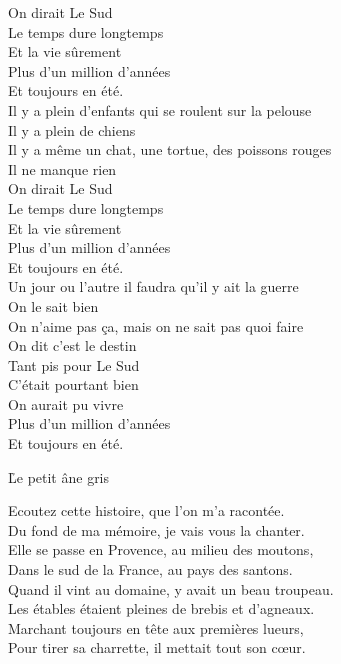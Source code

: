 \documentclass{novel}
\begin{document}
On dirait Le Sud \\
Le temps dure longtemps \\
Et la vie sûrement \\
Plus d'un million d'années \\
Et toujours en été. \\

Il y a plein d'enfants qui se roulent sur la pelouse \\
Il y a plein de chiens \\
Il y a même un chat, une tortue, des poissons rouges \\
Il ne manque rien \\

On dirait Le Sud \\
Le temps dure longtemps \\
Et la vie sûrement \\
Plus d'un million d'années \\
Et toujours en été. \\

Un jour ou l'autre il faudra qu'il y ait la guerre \\
On le sait bien \\
On n'aime pas ça, mais on ne sait pas quoi faire \\
On dit c'est le destin \\

Tant pis pour Le Sud \\
C'était pourtant bien \\
On aurait pu vivre \\
Plus d'un million d'années \\
Et toujours en été.

\newpage
\normalsize
\h*{Le petit âne gris}

Ecoutez cette histoire, que l'on m'a racontée. \\
Du fond de ma mémoire, je vais vous la chanter. \\
Elle se passe en Provence, au milieu des moutons, \\
Dans le sud de la France, au pays des santons. \\

Quand il vint au domaine, y avait un beau troupeau. \\
Les étables étaient pleines de brebis et d'agneaux. \\
Marchant toujours en tête aux premières lueurs, \\
Pour tirer sa charrette, il mettait tout son cœur. \\
\end{document}

